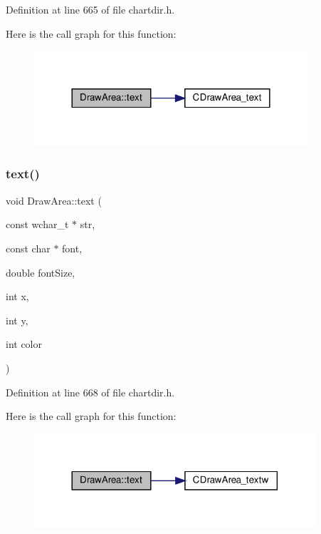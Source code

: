 Definition at line 665 of file chartdir.\+h.

Here is the call graph for this function\+:
\nopagebreak
\begin{figure}[H]
\begin{center}
\leavevmode
\includegraphics[width=288pt]{class_draw_area_a6656043a957ba9eccacfccc711027d99_cgraph}
\end{center}
\end{figure}
\mbox{\label{class_draw_area_ad30bedfc7e689705a650a9e262df0749}} 
\subsubsection{\texorpdfstring{text()}{text()}\hspace{0.1cm}{\footnotesize\ttfamily [2/8]}}
{\footnotesize\ttfamily void Draw\+Area\+::text (\begin{DoxyParamCaption}\item[{const wchar\+\_\+t $\ast$}]{str,  }\item[{const char $\ast$}]{font,  }\item[{double}]{font\+Size,  }\item[{int}]{x,  }\item[{int}]{y,  }\item[{int}]{color }\end{DoxyParamCaption})\hspace{0.3cm}{\ttfamily [inline]}}



Definition at line 668 of file chartdir.\+h.

Here is the call graph for this function\+:
\nopagebreak
\begin{figure}[H]
\begin{center}
\leavevmode
\includegraphics[width=296pt]{class_draw_area_ad30bedfc7e689705a650a9e262df0749_cgraph}
\end{center}
\end{figure}
\mbox{\label{class_draw_area_a2f38315c93227eb8ac4d1675e7ca0db7}} 
